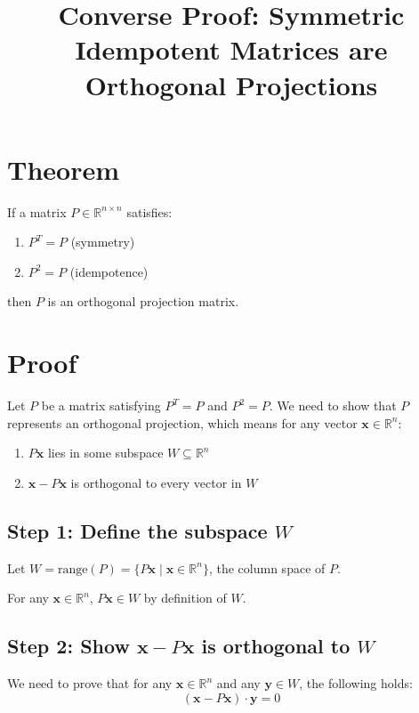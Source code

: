 \documentclass{article}
\begin{document}
\title{Converse Proof: Symmetric Idempotent Matrices are Orthogonal Projections}
\author{}
\date{}
\maketitle

\Large

\section*{Theorem}
If a matrix $P \in \mathbb{R}^{n \times n}$ satisfies:
\begin{enumerate}
    \item $P^T = P$ (symmetry)
    \item $P^2 = P$ (idempotence)
\end{enumerate}
then $P$ is an orthogonal projection matrix.

\section*{Proof}

Let $P$ be a matrix satisfying $P^T = P$ and $P^2 = P$. We need to show that $P$ represents an orthogonal projection, which means for any vector $\mathbf{x} \in \mathbb{R}^n$:

\begin{enumerate}
    \item $P\mathbf{x}$ lies in some subspace $W \subseteq \mathbb{R}^n$
    \item $\mathbf{x} - P\mathbf{x}$ is orthogonal to every vector in $W$
\end{enumerate}

\subsection*{Step 1: Define the subspace $W$}

Let $W = \text{range}(P) = \{P\mathbf{x} \mid \mathbf{x} \in \mathbb{R}^n\}$, the column space of $P$.

For any $\mathbf{x} \in \mathbb{R}^n$, $P\mathbf{x} \in W$ by definition of $W$.

\subsection*{Step 2: Show $\mathbf{x} - P\mathbf{x}$ is orthogonal to $W$}

We need to prove that for any $\mathbf{x} \in \mathbb{R}^n$ and any $\mathbf{y} \in W$, the following holds:
\[
(\mathbf{x} - P\mathbf{x}) \cdot \mathbf{y} = 0
\]
\end{document}
